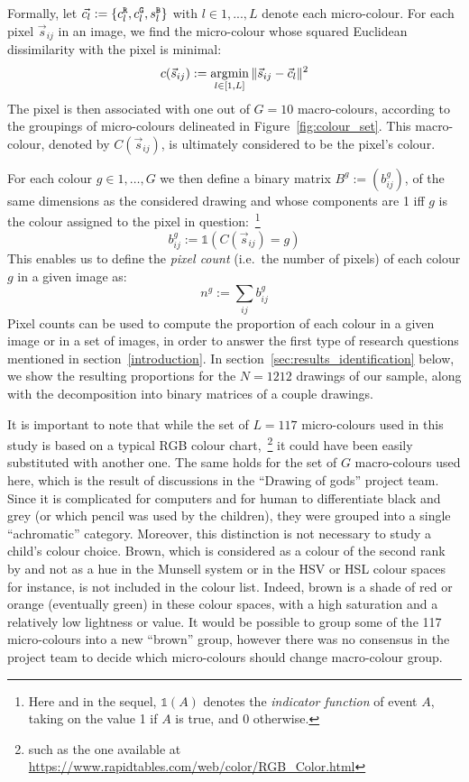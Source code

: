 \documentclass[11pt,a4paper]{article}
\begin{document}
Formally, let \(\vec{c_l} := \{ c^{\tt \scriptstyle R}_{l}, c^{\tt \scriptstyle G}_{l}, s^{\tt \scriptstyle B}_{l} \}\) with $l \in 1, ..., L$ denote each micro-colour. For each pixel \(\vec{s}_{ij}\) in an image, we find the micro-colour whose squared Euclidean dissimilarity with the pixel is minimal:
\begin{equation*}
c(\vec{s}_{ij}) := \operatornamewithlimits{argmin}_{l \in [1,L]} \| \vec{s}_{ij} - \vec{c}_{l} \|^{2}
\end{equation*}
The pixel is then associated with one out of $G = 10$ macro-colours, according to the groupings of micro-colours delineated in Figure~\ref{fig:colour_set}. This macro-colour, denoted by $C(\vec{s}_{ij})$, is ultimately considered to be the pixel's colour.

For each colour $g\in 1, \dots, G$ we then define a binary matrix $B^{g} := (b_{ij}^{g})$, of the same dimensions as the considered drawing and whose components are 1 iff $g$ is the colour assigned to the pixel in question:~\footnote{Here and in the sequel, $\mathds{1}(A)$ denotes the \textit{indicator function} of event $A$, taking on the value 1 if $A$ is true, and 0 otherwise.}
\begin{equation}
	b_{ij}^{g} := \mathds{1}(C(\vec{s}_{ij}) = g)
\end{equation}
This enables us to define the \textit{pixel count} (i.e.~the number of pixels) of each colour $g$ in a given image as:
\begin{equation}
	n^{g} := \sum_{ij}b_{ij}^{g}
\end{equation}
Pixel counts can be used to compute the proportion of each colour in a given image or in a set of images, in order to answer the first type of research questions mentioned in section~\ref{introduction}. In section~\ref{sec:results_identification} below, we show the resulting proportions for the $N = 1212$ drawings of our sample, along with the decomposition into binary matrices of a couple drawings.

It is important to note that while the set of $L=117$ micro-colours used in this study is based on a typical RGB colour chart,~\footnote{such as the one available at \url{https://www.rapidtables.com/web/color/RGB_Color.html}} it could have been easily substituted with another one. The same holds for the set of $G$ macro-colours used here, which is the result of discussions in the ``Drawing of gods'' project team. Since it is complicated for computers and for human to differentiate black and grey (or which pencil was used by the children), they were grouped into a single ``achromatic'' category. Moreover, this distinction is not necessary to study a child's colour choice. Brown, which is considered as a colour of the second rank by \citet{pastoureau2017} and not as a hue in the Munsell system or in the HSV or HSL colour spaces for instance, is not included in the colour list. Indeed, brown is a shade of red or orange (eventually green) in these colour spaces, with a high saturation and a relatively low lightness or value. It would be possible to group some of the 117 micro-colours into a new ``brown'' group, however there was no consensus in the project team to decide which micro-colours should change macro-colour group.
\end{document}
